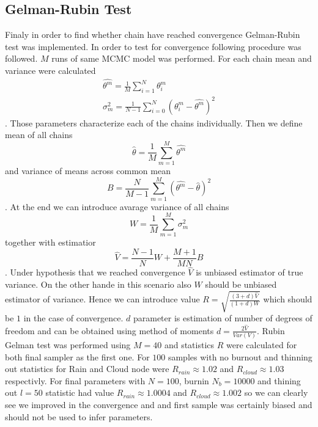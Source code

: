 \documentclass[12pt,a4paper]{article}
\begin{document}
\subsection{Gelman-Rubin Test}
\hspace{1cm} Finaly in order to find whether chain have reached convergence Gelman-Rubin test was implemented. In order to test for convergence 
following procedure was followed. $M$ runs of same MCMC model was performed. For each chain mean and variance were calculated
\begin{align}
    \hat{\theta^m}=\frac{1}{M}\sum_{i=1}^N \theta^{m}_i\\
    \sigma^2_m=\frac{1}{N-1}\sum_{i=0}^N (\theta^m_i-\hat{\theta^m})^2
\end{align}. Those parameters characterize each of the chains individually. Then we define mean of all chains
\begin{equation*}
    \hat{\theta}=\frac{1}{M}\sum_{m=1}^M \hat{\theta^m}
\end{equation*} and variance of means across common mean
\begin{equation*}
    B=\frac{N}{M-1}\sum_{m=1}^M (\hat{\theta^m}-\hat{\theta})^2
\end{equation*}. At the end we can introduce avarage variance of all chains
\begin{equation*}
    W=\frac{1}{M}\sum_{m=1}^M\sigma_m^{2}
\end{equation*} together with estimatior
\begin{equation*}
    \hat{V}=\frac{N-1}{N}W+\frac{M+1}{MN}B
\end{equation*}. Under hypothesis that we reached convergence $\hat{V}$ is unbiased estimator of true variance. On the other hande in this scenario 
also $W$ should be unbiased estimator of variance. Hence we can introduce value $R=\sqrt{\frac{(3+d)\hat{V}}{(1+d)W}}$ which should be $1$ in the case of convergence. 
$d$ parameter is estimation of number of degrees of freedom and can be obtained using method of moments $d=\frac{2\hat{V}}{Var(V)}$.
Rubin Gelman test was performed using $M=40$ and statistics $R$ were calculated for both final sampler as the first one. For $100$ samples with no burnout and thinning out statistics for Rain and Cloud node were
$R_{rain}\approx 1.02$ and $R_{cloud}\approx  1.03$ respectivly. For final parameters with $N=100$, burnin $N_b=10000$ and thining out $l=50$ statistic had value $R_{rain}\approx1.0004$
and $R_{cloud}\approx1.002$ so we can clearly see we improved in the convergence and and first sample was certainly biased and should not be used to infer parameters. 
\end{document}
